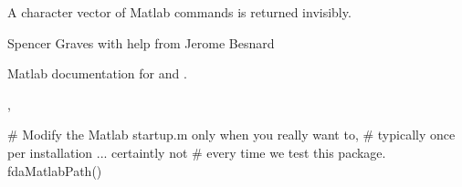 \documentclass{article}
\begin{document}
\begin{Value}
A character vector of Matlab  commands is returned
invisibly.
\end{Value}
\begin{Author}\relax
Spencer Graves with help from Jerome Besnard
\end{Author}
\begin{References}\relax
Matlab documentation for  and .
\end{References}
\begin{SeeAlso}\relax
{},
\end{SeeAlso}
\begin{Examples}
\begin{ExampleCode}
# Modify the Matlab startup.m only when you really want to,
# typically once per installation ... certaintly not
# every time we test this package.
fdaMatlabPath()
\end{ExampleCode}
\end{Examples}
\end{document}
